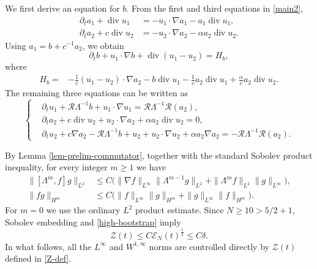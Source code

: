 \documentclass[10pt,reqno]{amsart}
\numberwithin{equation}{section}
\begin{document}
We first derive an equation for $b$.  From the first and third equations in
\eqref{main2},
\begin{align*}
\partial_ta_1+\operatorname{div}u_1
&=-u_1\cdot\nabla a_1-a_1\operatorname{div}u_1,\\
\partial_ta_2+c\operatorname{div}u_2
&=-u_2\cdot\nabla a_2-\alpha a_2\operatorname{div}u_2.
\end{align*}
Using $a_1=b+c^{-1}a_2$, we obtain
\begin{equation}\label{high-b-equation}
\partial_tb+u_1\cdot\nabla b+\operatorname{div}(u_1-u_2)=H_b,
\end{equation}
where
\begin{align}\label{high-Hb}
H_b=&-\frac1c(u_1-u_2)\cdot\nabla a_2
-b\operatorname{div}u_1-\frac1c a_2\operatorname{div}u_1
+\frac{\alpha}{c}a_2\operatorname{div}u_2.
\end{align}
The remaining three equations can be written as
\begin{equation}\label{high-rewritten-system}
\left\{
\begin{aligned}
&\partial_tu_1+\mathscr R\Lambda^{-1}b+u_1\cdot\nabla u_1
=\mathscr R\Lambda^{-1}\mathcal R(a_2),\\
&\partial_ta_2+c\operatorname{div}u_2+u_2\cdot\nabla a_2
+\alpha a_2\operatorname{div}u_2=0,\\
&\partial_tu_2+c\nabla a_2-\mathscr R\Lambda^{-1}b+u_2
+u_2\cdot\nabla u_2+\alpha a_2\nabla a_2
=-\mathscr R\Lambda^{-1}\mathcal R(a_2).
\end{aligned}
\right.
\end{equation}

By Lemma \ref{lem-prelim-commutator}, together with the standard Sobolev
product inequality, for every integer $m\ge1$ we have
\begin{align}\label{high-commutator}
\|[\Lambda^m,f]g\|_{L^2}
&\le C\big(\|\nabla f\|_{L^\infty}\|\Lambda^{m-1}g\|_{L^2}
+\|\Lambda^mf\|_{L^2}\|g\|_{L^\infty}\big),\\
\label{high-product}
\|fg\|_{H^m}
&\le C\big(\|f\|_{L^\infty}\|g\|_{H^m}
+\|g\|_{L^\infty}\|f\|_{H^m}\big).
\end{align}
For $m=0$ we use the ordinary $L^2$ product estimate. Since
$N\ge10>5/2+1$, Sobolev embedding and \eqref{high-bootstrap} imply
\[
\mathcal Z(t)\le C\mathcal E_N(t)^{\frac{1}{2}}\le C\delta.
\]
In what follows, all the $L^\infty$ and $W^{1,\infty}$ norms are
controlled directly by $\mathcal Z(t)$ defined in \eqref{Z-def}.
\end{document}
